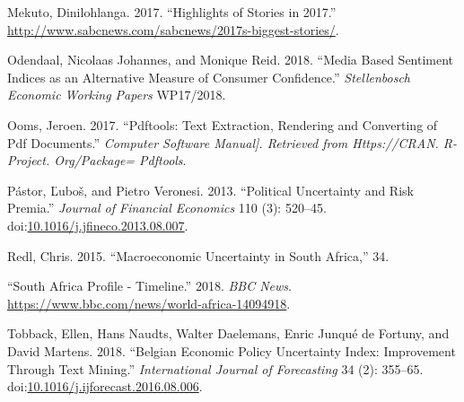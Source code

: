 \documentclass[11pt,preprint, authoryear]{elsarticle}
\numberwithin{equation}{section}
\numberwithin{figure}{section}
\numberwithin{table}{section}
\begin{document}
\hypertarget{ref-Mekuto2017}{}
Mekuto, Dinilohlanga. 2017. ``Highlights of Stories in 2017.''
\url{http://www.sabcnews.com/sabcnews/2017s-biggest-stories/}.

\hypertarget{ref-Odendaal2018}{}
Odendaal, Nicolaas Johannes, and Monique Reid. 2018. ``Media Based
Sentiment Indices as an Alternative Measure of Consumer Confidence.''
\emph{Stellenbosch Economic Working Papers} WP17/2018.

\hypertarget{ref-Ooms2017}{}
Ooms, Jeroen. 2017. ``Pdftools: Text Extraction, Rendering and
Converting of Pdf Documents.'' \emph{Computer Software Manual{]}.
Retrieved from Https://CRAN. R-Project. Org/Package= Pdftools}.

\hypertarget{ref-Pastor2013}{}
Pástor, Ľuboš, and Pietro Veronesi. 2013. ``Political Uncertainty and
Risk Premia.'' \emph{Journal of Financial Economics} 110 (3): 520--45.
doi:\href{https://doi.org/10.1016/j.jfineco.2013.08.007}{10.1016/j.jfineco.2013.08.007}.

\hypertarget{ref-Redl2015}{}
Redl, Chris. 2015. ``Macroeconomic Uncertainty in South Africa,'' 34.

\hypertarget{ref-2018}{}
``South Africa Profile - Timeline.'' 2018. \emph{BBC News}.
\url{https://www.bbc.com/news/world-africa-14094918}.

\hypertarget{ref-Tobback2018}{}
Tobback, Ellen, Hans Naudts, Walter Daelemans, Enric Junqué de Fortuny,
and David Martens. 2018. ``Belgian Economic Policy Uncertainty Index:
Improvement Through Text Mining.'' \emph{International Journal of
Forecasting} 34 (2): 355--65.
doi:\href{https://doi.org/10.1016/j.ijforecast.2016.08.006}{10.1016/j.ijforecast.2016.08.006}.




\end{document}
